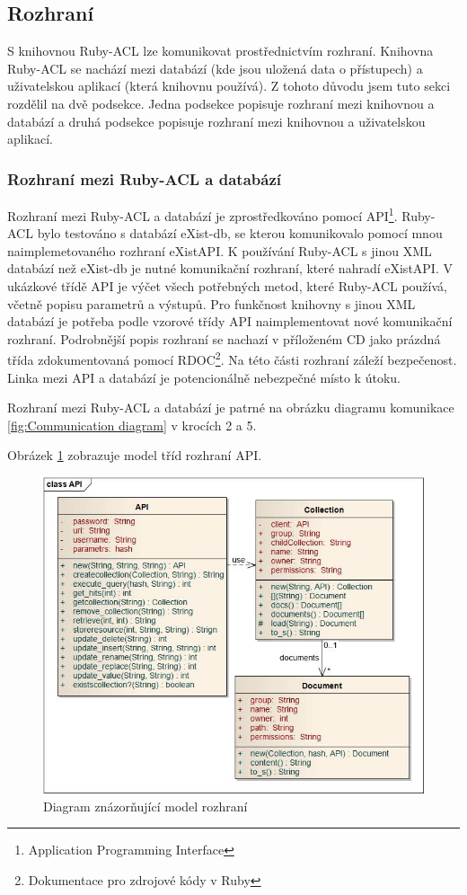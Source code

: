 \subsection{Rozhraní}
S knihovnou Ruby-ACL lze komunikovat prostřednictvím rozhraní. Knihovna Ruby-ACL se nachází mezi databází (kde jsou uložená data o přístupech) a uživatelskou aplikací (která knihovnu používá). Z tohoto důvodu jsem tuto sekci rozdělil na dvě podsekce. Jedna podsekce popisuje rozhraní mezi knihovnou a databází a druhá podsekce popisuje rozhraní mezi knihovnou a uživatelskou aplikací. 


\subsubsection{Rozhraní mezi Ruby-ACL a databází}
Rozhraní mezi Ruby-ACL a databází je zprostředkováno pomocí API\footnote{Application Programming Interface}.
Ruby-ACL bylo testováno s databází eXist-db, se kterou komunikovalo pomocí mnou naimplemetovaného rozhraní eXistAPI. 
K používání Ruby-ACL s jinou XML databází než eXist-db je nutné komunikační rozhraní, které nahradí eXistAPI.
V ukázkové třídě API je výčet všech potřebných metod, které Ruby-ACL používá, včetně popisu parametrů a výstupů. Pro funkčnost knihovny s jinou XML databází je potřeba podle vzorové třídy API naimplementovat nové komunikační rozhraní. 
Podrobnější popis rozhraní se nachazí v příloženém CD jako prázdná třída zdokumentovaná pomocí RDOC\footnote{Dokumentace pro zdrojové kódy v Ruby}. Na této části rozhraní záleží bezpečenost. Linka mezi API a databází je potencionálně nebezpečné místo k útoku.

\noindent Rozhraní mezi Ruby-ACL a databází je patrné na obrázku diagramu komunikace \ref{fig:Communication diagram} v krocích 2 a 5.

\noindent Obrázek \ref{fig:API_interface} zobrazuje model tříd rozhraní API.

\begin{figure}
\includegraphics[width=15cm]{API1.jpg}
\caption{Diagram znázorňující model rozhraní}
\label{fig:API_interface}
\end{figure}

